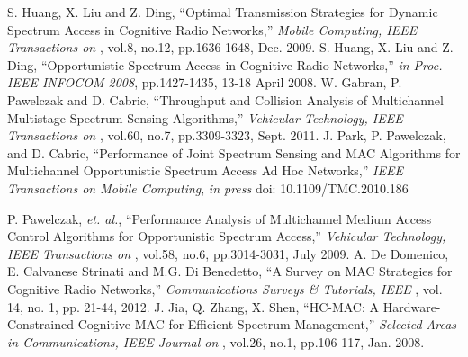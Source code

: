 \begin{thebibliography}{1}
 S. Huang, X. Liu and Z. Ding, ``Optimal Transmission Strategies for Dynamic Spectrum Access in Cognitive Radio Networks,'' \emph{Mobile Computing, IEEE Transactions on }, vol.8, no.12, pp.1636-1648, Dec. 2009.
 S. Huang, X. Liu and Z. Ding, ``Opportunistic Spectrum Access in Cognitive Radio Networks,'' \emph{in Proc. IEEE INFOCOM 2008}, pp.1427-1435, 13-18 April 2008.
 W. Gabran, P. Pawelczak and D. Cabric, ``Throughput and Collision Analysis of Multichannel Multistage Spectrum Sensing Algorithms,'' \emph{Vehicular Technology, IEEE Transactions on }, vol.60, no.7, pp.3309-3323, Sept. 2011.
 J. Park, P. Pawelczak, and D. Cabric, ``Performance of Joint Spectrum Sensing and MAC Algorithms for Multichannel Opportunistic Spectrum Access Ad Hoc Networks,'' \emph{ IEEE Transactions on Mobile Computing}, \textit{in press} doi: 10.1109/TMC.2010.186













 P. Pawelczak, \textit{et. al.}, ``Performance Analysis of Multichannel Medium Access Control Algorithms for Opportunistic Spectrum Access,'' \emph{Vehicular Technology, IEEE Transactions on }, vol.58, no.6, pp.3014-3031, July 2009.
 A. De Domenico, E. Calvanese Strinati and M.G. Di Benedetto, ``A Survey on MAC Strategies for Cognitive Radio Networks,'' \emph{Communications Surveys \& Tutorials, IEEE }, vol. 14, no. 1, pp. 21-44, 2012.
 J. Jia, Q. Zhang, X. Shen, ``HC-MAC: A Hardware-Constrained Cognitive MAC for Efficient Spectrum Management,'' \emph{Selected Areas in Communications, IEEE Journal on }, vol.26, no.1, pp.106-117, Jan. 2008.


\end{thebibliography}

